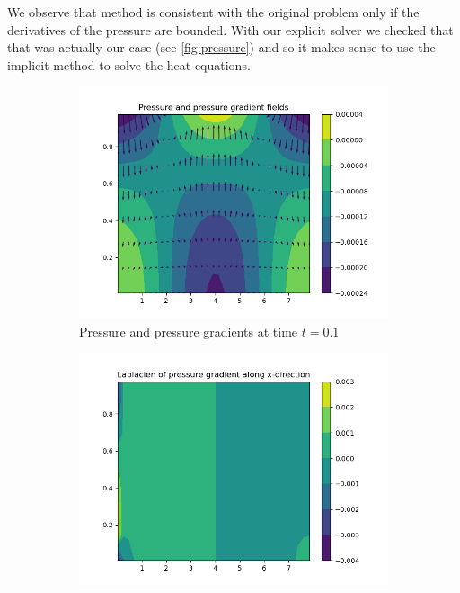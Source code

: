 \documentclass{article}
\begin{document}
We observe that method is consistent with the original problem only if the derivatives of the pressure are bounded. With our explicit solver we checked that that was actually our case (see \cref{fig:pressure}) and so it makes sense to use the implicit method to solve the heat equations.

\begin{figure}[ht]
  \centering
  \begin{subfigure}{0.32\textwidth}
    \centering
    \includegraphics[width=\textwidth]{images/pressure_data/pressure_pressuregradient.png}
    \caption{Pressure and pressure gradients at time $t=0.1$}
  \end{subfigure}\hfill
  \begin{subfigure}{0.32\textwidth}
    \centering
    \includegraphics[width=\textwidth]{images/pressure_data/laplacien_gradient_x.png}

\end{subfigure}
\end{figure}
\end{document}
